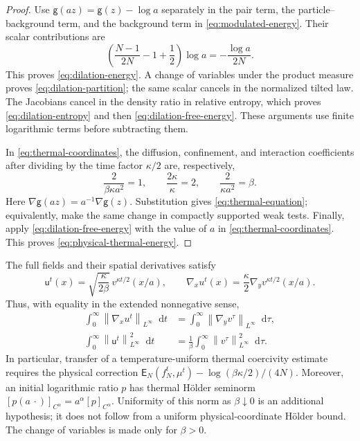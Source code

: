 \documentclass[11pt,reqno]{amsart}
\numberwithin{equation}{section}
\theoremstyle{definition}
\theoremstyle{remark}
\newcommand{\g}{\mathsf g}
\newcommand{\Er}{\mathsf E}
\renewcommand{\u}{\mathsf u}
\newcommand{\dd}{\mathop{}\!\mathrm d}
\newcommand{\norm}[1]{\left\lVert#1\right\rVert}
\begin{document}
\begin{proof}
Use $\g(az)=\g(z)-\log a$ separately in the pair term, the particle--background term, and the background term in \eqref{eq:modulated-energy}. Their scalar contributions are
\begin{equation}\label{eq:dilation-scalar-count}
 \left(\frac{N-1}{2N}-1+\frac12\right)\log a
 =-\frac{\log a}{2N}.
\end{equation}
This proves \eqref{eq:dilation-energy}. A change of variables under the product measure proves \eqref{eq:dilation-partition}; the same scalar cancels in the normalized tilted law. The Jacobians cancel in the density ratio in relative entropy, which proves \eqref{eq:dilation-entropy} and then \eqref{eq:dilation-free-energy}. These arguments use finite logarithmic terms before subtracting them.

In \eqref{eq:thermal-coordinates}, the diffusion, confinement, and interaction coefficients after dividing by the time factor $\kappa/2$ are, respectively,
\begin{equation}\label{eq:thermal-coefficient-check}
 \frac{2}{\beta\kappa a^2}=1,\qquad
 \frac{2\kappa}{\kappa}=2,\qquad
 \frac{2}{\kappa a^2}=\beta.
\end{equation}
Here $\nabla\g(az)=a^{-1}\nabla\g(z)$. Substitution gives \eqref{eq:thermal-equation}; equivalently, make the same change in compactly supported weak tests. Finally, apply \eqref{eq:dilation-free-energy} with the value of $a$ in \eqref{eq:thermal-coordinates}. This proves \eqref{eq:physical-thermal-energy}.
\end{proof}

The full fields and their spatial derivatives satisfy
\begin{equation}\label{eq:thermal-field-scaling}
 \u^t(x)=\sqrt{\frac{\kappa}{2\beta}}\,
       v^{\kappa t/2}(x/a),\qquad
 \nabla_xu^t(x)=\frac\kappa2\nabla_yv^{\kappa t/2}(x/a).
\end{equation}
Thus, with equality in the extended nonnegative sense,
\begin{align}
 \int_0^\infty\norm{\nabla_xu^t}_{L^\infty}\dd t
 &=\int_0^\infty\norm{\nabla_yv^\tau}_{L^\infty}\dd\tau,
 \label{eq:thermal-integrated-lipschitz}\\
 \int_0^\infty\norm{\u^t}_{L^\infty}^2\dd t
 &=\frac1\beta\int_0^\infty\norm{v^\tau}_{L^\infty}^2\dd\tau.
 \label{eq:thermal-integrated-field}
\end{align}
In particular, transfer of a temperature-uniform thermal coercivity estimate requires the physical correction
$\Er_N(f_N^t,\mu^t)-\log(\beta\kappa/2)/(4N)$. Moreover, an initial logarithmic ratio $p$ has thermal H\"older seminorm $[p(a\,\cdot)]_{C^\alpha}=a^\alpha[p]_{C^\alpha}$. Uniformity of this norm as $\beta\downarrow0$ is an additional hypothesis; it does not follow from a uniform physical-coordinate H\"older bound. The change of variables is made only for $\beta>0$.
\endgroup
\end{document}
